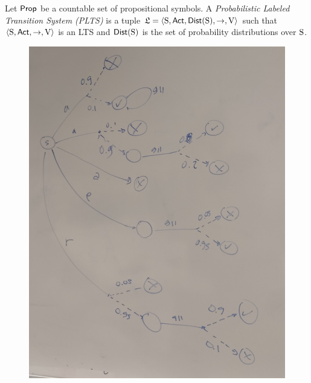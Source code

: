 \begin{definition}\label{def:plts}
    Let $\PROP$ be a countable set of propositional symbols. 
    A \emph{Probabilistic Labeled Transition System (PLTS)}  is a tuple
    $\model=\tup{\S,\ACT,\dist(\S),\ra,\V}$ such that $\tup{\S,\ACT,\ra,\V}$ is an LTS and $\dist(\S)$ is the set of probability distributions over $\S$.
\end{definition}

    \begin{figure}[t]
        \begin{center}
            \includegraphics[scale=0.1]{PLTS.jpg}
        \end{center}
    \end{figure}

